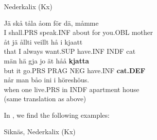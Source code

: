 \item 

Nederkalix (Kx)



 \ea\label{}
\gll Jä  skå  tåla  åom  för  dä,  måmme\\


I  shall.PRS  speak.INF  about  for  you.OBL  mother\\

 \ea\label{}
\gll åt  jä  ållti  veillt  hå  i  kjaatt\\


that  I  always  want.SUP  have.INF  INDF  cat  \\

 \ea\label{}
\gll män  hä  gja  jo  ät  håå  \textbf{kjatta}\\


but  it  go.PRS  PRAG  NEG  have.INF  \textbf{cat.DEF}\\

 \ea\label{}
\gll når  man  båo   ini  i  höreshöus.\\


when  one  live.PRS  in  INDF  apartment house\\

\glt (same translation as above)

\z

In \citet{Stenberg1971}, we find the following examples:


\item 

Siknäs, Nederkalix (Kx)



\item 

